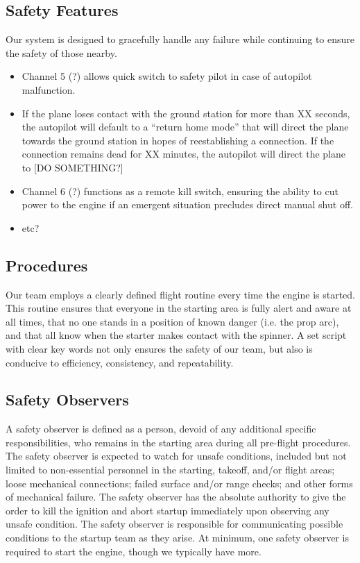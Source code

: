 \documentclass[10pt,twocolumns]{report}
\begin{document}
\subsection{Safety Features}
Our system is designed to gracefully handle any failure while continuing to ensure the safety of those nearby. 
\begin{itemize}
	\setlength{\itemsep}{0cm}
	\setlength{\parskip}{0cm}
	\item Channel 5 (?) allows quick switch to safety pilot in case of autopilot malfunction.
	\item If the plane loses contact with the ground station for more than XX seconds, the autopilot will default to a ``return home mode'' that will direct the plane towards the ground station in hopes of reestablishing a connection.  If the connection remains dead for XX minutes, the autopilot will direct the plane to [DO SOMETHING?]
	\item Channel 6 (?) functions as a remote kill switch, ensuring the ability to cut power to the engine if an emergent situation precludes direct manual shut off.
	\item etc?
\end{itemize}

\subsection{Procedures}
Our team employs a clearly defined flight routine every time the engine is started.  This routine ensures that everyone in the starting area is fully alert and aware at all times, that no one stands in a position of known danger (i.e. the prop arc), and that all know when the starter makes contact with the spinner.  A set script with clear key words not only ensures the safety of our team, but also is conducive to efficiency, consistency, and repeatability.

\subsection{Safety Observers}
A safety observer is defined as a person, devoid of any additional specific responsibilities, who remains in the starting area during all pre-flight procedures.  The safety observer is expected to watch for unsafe conditions, included but not limited to non-essential personnel in the starting, takeoff, and/or flight areas; loose mechanical connections; failed surface and/or range checks; and other forms of mechanical failure.  The safety observer has the absolute authority to give the order to kill the ignition and abort startup immediately upon observing any unsafe condition.  The safety observer is responsible for communicating possible conditions to the startup team as they arise. At minimum, one safety observer is required to start the engine, though we typically have more.
\end{document}
